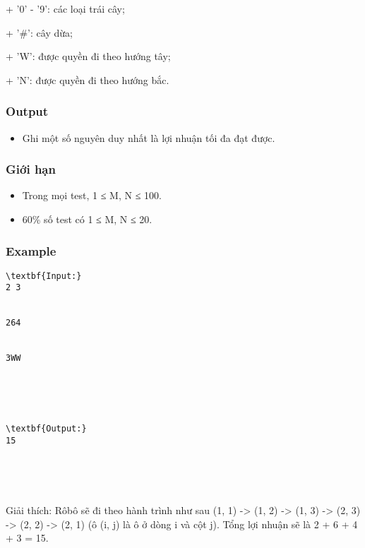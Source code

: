    + '0' - '9': các loại trái cây;  

   + '\#': cây dừa;  

   + 'W': được quyền đi theo hướng tây;  

   + 'N': được quyền đi theo hướng bắc.  

\subsubsection{   Output  }
\begin{itemize}
	\item     Ghi một số nguyên duy nhất là lợi nhuận tối đa đạt được.   
\end{itemize}

\subsubsection{   Giới hạn  }
\begin{itemize}
	\item     Trong mọi test, 1 ≤ M, N ≤ 100.   
	\item     60\% số test có 1 ≤ M, N ≤ 20.   
\end{itemize}

\subsubsection{   Example  }
\begin{verbatim}
\textbf{Input:}
2 3


264


3WW





\textbf{Output:}
15





\end{verbatim}

Giải thích: Rôbô sẽ đi theo hành trình như sau (1, 1) -> (1, 2) -> (1, 3) -> (2, 3) -> (2, 2) -> (2, 1) (ô (i, j) là ô ở dòng i và cột j). Tổng lợi nhuận sẽ là 2 + 6 + 4 + 3 = 15.
